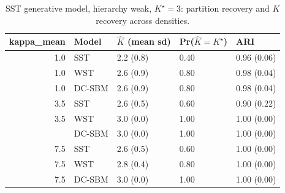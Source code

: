 \begin{table}
\centering
\caption{SST generative model, hierarchy weak, $K^\star=3$: partition recovery and $K$ recovery across densities.}
\centering
\begin{tabular}[t]{rllll}
\toprule
kappa_mean & Model & $\hat K$ (mean sd) & Pr($\hat K = K^\star$) & ARI\\
\midrule
1.0 & SST & 2.2 (0.8) & 0.40 & 0.96 (0.06)\\
1.0 & WST & 2.6 (0.9) & 0.80 & 0.98 (0.04)\\
1.0 & DC-SBM & 2.6 (0.9) & 0.80 & 0.98 (0.04)\\
3.5 & SST & 2.6 (0.5) & 0.60 & 0.90 (0.22)\\
3.5 & WST & 3.0 (0.0) & 1.00 & 1.00 (0.00)\\
\addlinespace
3.5 & DC-SBM & 3.0 (0.0) & 1.00 & 1.00 (0.00)\\
7.5 & SST & 2.6 (0.5) & 0.60 & 1.00 (0.00)\\
7.5 & WST & 2.8 (0.4) & 0.80 & 1.00 (0.00)\\
7.5 & DC-SBM & 3.0 (0.0) & 1.00 & 1.00 (0.00)\\
\bottomrule
\end{tabular}
\end{table}
